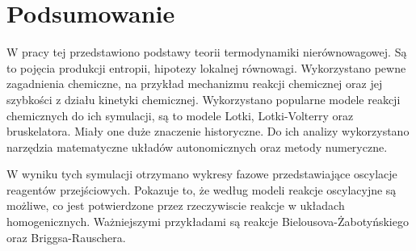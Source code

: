 \documentclass[10pt, a4paper, twoside, onecolumn]{article}
\numberwithin{equation}{section}
\begin{document}
	\section{Podsumowanie}
	W pracy tej przedstawiono podstawy teorii termodynamiki nierównowagowej. Są to pojęcia produkcji entropii, hipotezy lokalnej równowagi. Wykorzystano pewne zagadnienia chemiczne, na przykład mechanizmu reakcji chemicznej oraz jej szybkości z działu kinetyki chemicznej. Wykorzystano popularne modele reakcji chemicznych do ich symulacji, są to modele Lotki, Lotki-Volterry oraz bruskelatora. Miały one duże znaczenie historyczne. Do ich analizy wykorzystano narzędzia matematyczne układów autonomicznych oraz metody numeryczne. \par
	W wyniku tych symulacji otrzymano wykresy fazowe przedstawiające oscylacje reagentów przejściowych. Pokazuje to, że według modeli reakcje oscylacyjne są możliwe, co jest potwierdzone przez rzeczywiscie reakcje w układach homogenicznych. Ważniejszymi przykładami są reakcje Bielousova-Żabotyńskiego oraz Briggsa-Rauschera.
	
	\pagebreak
	\printbibliography[title=Wykaz literatury]
	\pagebreak
	\listoffigures
	\pagebreak
	\listoftables
	\pagebreak
	
\end{document}
